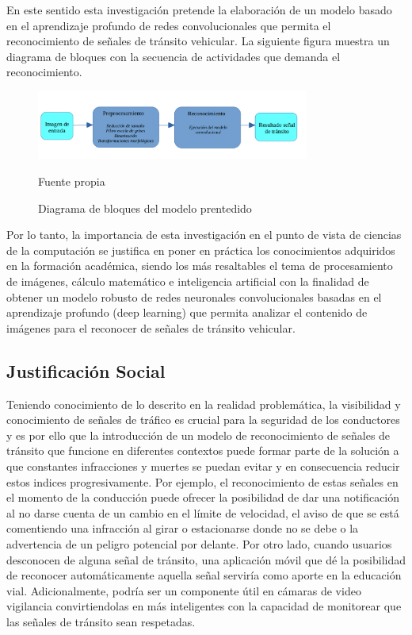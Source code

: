 	En este sentido esta investigación pretende la elaboración de un modelo basado en el aprendizaje profundo de redes convolucionales que permita el reconocimiento de señales de tránsito vehicular. La siguiente figura muestra un diagrama de bloques con la secuencia de actividades que demanda el reconocimiento.



	\begin{figure}[H]
	\begin{center}
	\includegraphics[width=0.8\textwidth]{images/intro/bloque}
	\end{center}
	\begin{center}
	\caption{\small{Diagrama de bloques del modelo prentedido}}
	{\small{Fuente propia}}
	\end{center}
	\vspace{-1.5em}
	\end{figure}


	Por lo tanto, la importancia de esta investigación en el punto de vista de ciencias de la computación se justifica en poner en práctica los conocimientos adquiridos en la formación académica, siendo los más resaltables el tema de procesamiento de imágenes, cálculo matemático e inteligencia artificial con la finalidad de obtener un modelo robusto de redes neuronales convolucionales basadas en el aprendizaje profundo (deep learning) que permita analizar el contenido de imágenes para el reconocer de señales de tránsito vehicular. 


	\subsection{Justificación Social}
	
	Teniendo conocimiento de lo descrito en la realidad problemática, la visibilidad y conocimiento de señales de tráfico es crucial para la seguridad de los conductores y es por ello que la introducción de un modelo de reconocimiento de señales de tránsito que funcione en diferentes contextos puede formar parte de la solución a que constantes infracciones y muertes se puedan evitar y en consecuencia reducir estos indices progresivamente. Por ejemplo, el reconocimiento de estas señales en el momento de la conducción puede ofrecer la posibilidad de dar una notificación al no darse cuenta de un cambio en el límite de velocidad, el aviso de que se está comentiendo una infracción al girar o estacionarse donde no se debe o la advertencia de un peligro potencial por delante. Por otro lado, cuando usuarios desconocen de alguna señal de tránsito, una aplicación móvil que dé la posibilidad de reconocer automáticamente aquella señal serviría como aporte en la educación vial. Adicionalmente, podría ser un componente útil en cámaras de video vigilancia convirtiendolas en más inteligentes con la capacidad de monitorear que las señales de tránsito sean respetadas.\vskip 0.2cm

